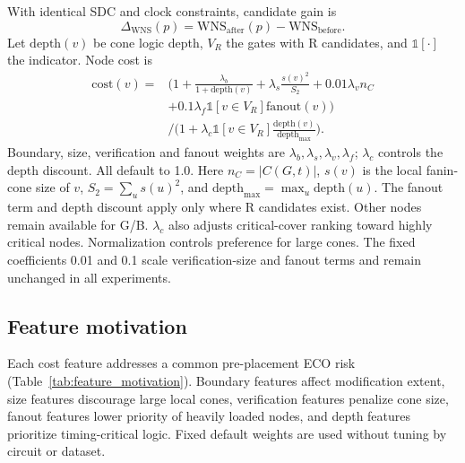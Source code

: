 \documentclass[preprint,12pt]{elsarticle}
\begin{document}
With identical SDC and clock constraints, candidate gain is
\begin{equation}\label{eq:dtiming}
\Delta_{\mathrm{WNS}}(p)=\mathrm{WNS}_{\mathrm{after}}(p)-\mathrm{WNS}_{\mathrm{before}}.
\end{equation}
Let $\mathrm{depth}(v)$ be cone logic depth, $V_R$ the gates with R candidates, and $\mathbb1[\cdot]$ the indicator. Node cost is
\begin{equation}\label{eq:cost}
\begin{aligned}
\mathrm{cost}(v)={}&\Big(1+\frac{\lambda_b}{1+\mathrm{depth}(v)}+\lambda_s\frac{s(v)^2}{S_2}
 +0.01\lambda_v n_C\\
 &+0.1\lambda_f\mathbb1[v\in V_R]\mathrm{fanout}(v)\Big)\\
 &\Big/\Big(1+\lambda_c\mathbb1[v\in V_R]\frac{\mathrm{depth}(v)}{\mathrm{depth}_{\max}}\Big).
\end{aligned}
\end{equation}
Boundary, size, verification and fanout weights are $\lambda_b,\lambda_s,\lambda_v,\lambda_f$; $\lambda_c$ controls the depth discount. All default to 1.0. Here $n_C=|C(G,t)|$, $s(v)$ is the local fanin-cone size of $v$, $S_2=\sum_u s(u)^2$, and $\mathrm{depth}_{\max}=\max_u\mathrm{depth}(u)$. The fanout term and depth discount apply only where R candidates exist. Other nodes remain available for G/B. $\lambda_c$ also adjusts critical-cover ranking toward highly critical nodes. Normalization controls preference for large cones. The fixed coefficients 0.01 and 0.1 scale verification-size and fanout terms and remain unchanged in all experiments.

\subsection{Feature motivation}\label{sec:feature_motivation}
Each cost feature addresses a common pre-placement ECO risk (Table~\ref{tab:feature_motivation}). Boundary features affect modification extent, size features discourage large local cones, verification features penalize cone size, fanout features lower priority of heavily loaded nodes, and depth features prioritize timing-critical logic. Fixed default weights are used without tuning by circuit or dataset.
\end{document}
